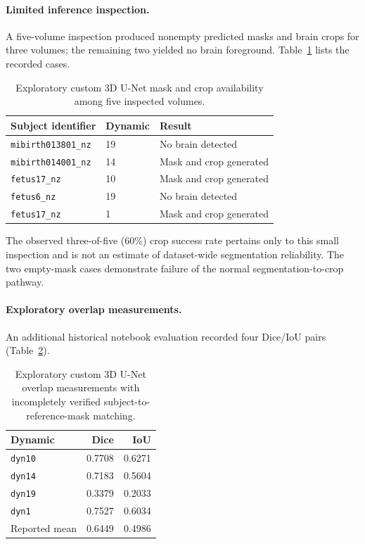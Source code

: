 \paragraph{Limited inference inspection.}
A five-volume inspection produced nonempty predicted masks and brain crops for three volumes; the remaining two yielded no brain foreground. Table~\ref{tab:historical_unet_crop_inspection} lists the recorded cases.

\begin{table}[htbp]
\centering
\caption{Exploratory custom 3D U-Net mask and crop availability among five inspected volumes.}
\label{tab:historical_unet_crop_inspection}
\begin{tabular}{llp{}}
\hline
Subject identifier & Dynamic & Result \\
\hline
\texttt{mibirth013801\_nz} & 19 & No brain detected \\
\texttt{mibirth014001\_nz} & 14 & Mask and crop generated \\
\texttt{fetus17\_nz} & 10 & Mask and crop generated \\
\texttt{fetus6\_nz} & 19 & No brain detected \\
\texttt{fetus17\_nz} & 1 & Mask and crop generated \\
\hline
\end{tabular}
\end{table}

The observed three-of-five (60\%) crop success rate pertains only to this small inspection and is not an estimate of dataset-wide segmentation reliability. The two empty-mask cases demonstrate failure of the normal segmentation-to-crop pathway.

\paragraph{Exploratory overlap measurements.}
An additional historical notebook evaluation recorded four Dice/IoU pairs (Table~\ref{tab:historical_unet_overlap}).

\begin{table}[htbp]
\centering
\caption{Exploratory custom 3D U-Net overlap measurements with incompletely verified subject-to-reference-mask matching.}
\label{tab:historical_unet_overlap}
\begin{tabular}{lrr}
\hline
Dynamic & Dice & IoU \\
\hline
\texttt{dyn10} & 0.7708 & 0.6271 \\
\texttt{dyn14} & 0.7183 & 0.5604 \\
\texttt{dyn19} & 0.3379 & 0.2033 \\
\texttt{dyn1} & 0.7527 & 0.6034 \\
\hline
Reported mean & 0.6449 & 0.4986 \\
\hline
\end{tabular}
\end{table}

